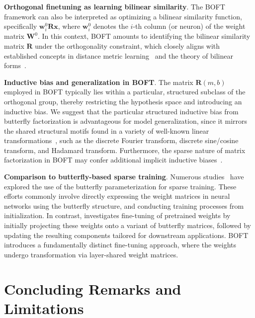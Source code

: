 \textbf{Orthogonal finetuning as learning bilinear similarity}. The BOFT framework can also be interpreted as optimizing a bilinear similarity function, specifically $\bm{w}^0_i\bm{R}\bm{x}$, where $\bm{w}^0_i$ denotes the $i$-th column (or neuron) of the weight matrix $\bm{W}^0$. In this context, BOFT amounts to identifying the bilinear similarity matrix $\bm{R}$ under the orthogonality constraint, which closely aligns with established concepts in distance metric learning~\cite{xing2002distance} and the theory of bilinear forms~\cite{roman2005advanced}.

\textbf{Inductive bias and generalization in BOFT}. The matrix $\bm{R}(m,b)$ employed in BOFT typically lies within a particular, structured subclass of the orthogonal group, thereby restricting the hypothesis space and introducing an inductive bias. We suggest that the particular structured inductive bias from butterfly factorization is advantageous for model generalization, since it mirrors the shared structural motifs found in a variety of well-known linear transformations~\cite{dao2019kaleidoscope}, such as the discrete Fourier transform, discrete sine/cosine transform, and Hadamard transform. Furthermore, the sparse nature of matrix factorization in BOFT may confer additional implicit inductive biases~\cite{gunasekar2017implicit,li2018algorithmic,liu2019neural}.

\textbf{Comparison to butterfly-based sparse training}. Numerous studies~\cite{dao2019learning,dao2019kaleidoscope,chen2022pixelated,dao2022monarch} have explored the use of the butterfly parameterization for sparse training. These efforts commonly involve directly expressing the weight matrices in neural networks using the butterfly structure, and conducting training processes from initialization. In contrast, \cite{dao2022monarch} investigates fine-tuning of pretrained weights by initially projecting these weights onto a variant of butterfly matrices, followed by updating the resulting components tailored for downstream applications. BOFT introduces a fundamentally distinct fine-tuning approach, where the weights undergo transformation via layer-shared weight matrices.



\section{Concluding Remarks and Limitations}

